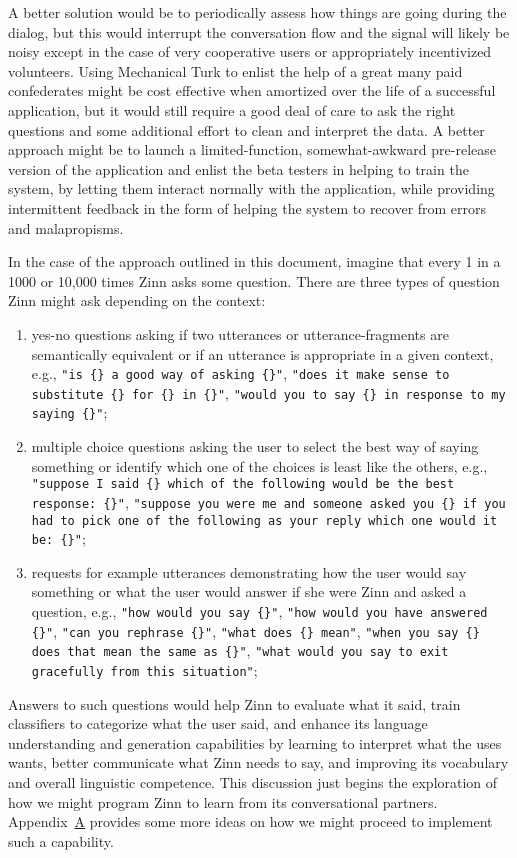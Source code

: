 \documentclass[letterpaper,11pt]{article}
\begin{document}
A better solution would be to periodically assess how things are going during the dialog, but this would interrupt the conversation flow and the signal will likely be noisy except in the case of very cooperative users or appropriately incentivized volunteers. Using Mechanical Turk to enlist the help of a great many paid confederates might be cost effective when amortized over the life of a successful application, but it would still require a good deal of care to ask the right questions and some additional effort to clean and interpret the data.  A better approach might be to launch a limited-function, somewhat-awkward pre-release version of the application and enlist the beta testers in helping to train the system, by letting them interact normally with the application, while providing intermittent feedback in the form of helping the system to recover from errors and malapropisms. 

In the case of the approach outlined in this document, imagine that every 1 in a 1000 or 10,000 times Zinn asks some question. There are three types of question Zinn might ask depending on the context:
%
\begin{enumerate}
%
\item yes-no questions asking if two utterances or utterance-fragments are semantically equivalent or if an utterance is appropriate in a given context, e.g., {\tt{"is \{\} a good way of asking \{\}"}}, {\tt{"does it make sense to substitute \{\} for \{\} in \{\}"}},  {\tt{"would you to say \{\} in response to my saying \{\}"}};
%
\item multiple choice questions asking the user to select the best way of saying something or identify which one of the choices is least like the others, e.g., {\tt{"suppose I said \{\} which of the following would be the best response: \{\}"}}, {\tt{"suppose you were me and someone asked you \{\} if you had to pick one of the following as your reply which one would it be: \{\}"}};
%
\item requests for example utterances demonstrating how the user would say something or what the user would answer if she were Zinn and asked a question, e.g., {\tt{"how would you say \{\}"}}, {\tt{"how would you have answered \{\}"}}, {\tt{"can you rephrase \{\}"}}, {\tt{"what does \{\} mean"}}, {\tt{"when you say \{\} does that mean the same as \{\}"}}, {\tt{"what would you say to exit gracefully from this situation"}};
%
\end{enumerate}
%
Answers to such questions would help Zinn to evaluate what it said, train classifiers to categorize what the user said, and enhance its language understanding and generation capabilities by learning to interpret what the uses wants, better communicate what Zinn needs to say, and improving its vocabulary and overall linguistic competence. This discussion just begins the exploration of how we might program Zinn to learn from its conversational partners. Appendix~\href{#append_collaborative_understanding}{A} provides some more ideas on how we might proceed to implement such a capability.
\end{document}
